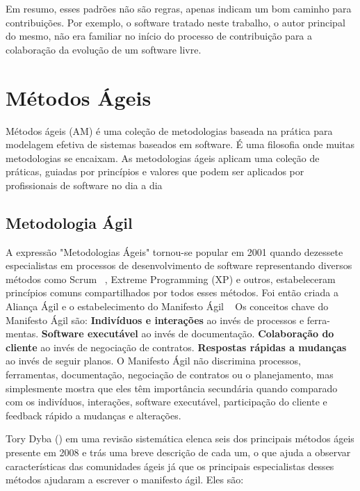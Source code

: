 
Em resumo, esses padrões não são regras, apenas indicam um bom caminho para contribuições. Por exemplo, o software tratado neste trabalho, o autor principal do mesmo, não era familiar no início do processo de contribuição para a colaboração da evolução de um software livre.

\section{Métodos Ágeis}
\label{sec-metedos-ageis}

Métodos ágeis (AM) é uma coleção de metodologias baseada na prática para modelagem efetiva de sistemas baseados em software. É uma filosofia onde muitas metodologias se encaixam. As metodologias ágeis aplicam uma coleção de práticas, guiadas por princípios e valores que podem ser aplicados por profissionais de software no dia a dia~\cite{manifesto2001}%

\subsection{Metodologia Ágil}
\label{metodologia-agil}

A expressão "Metodologias Ágeis" tornou-se popular em 2001 quando dezessete especialistas em processos de desenvolvimento de software representando diversos métodos como Scrum ~\cite{schwaber2002},
Extreme Programming (XP) e outros, estabeleceram princípios comuns compartilhados por todos esses métodos. Foi então criada a Aliança Ágil e o estabelecimento do Manifesto Ágil ~\cite{manifesto2001}
Os conceitos chave do Manifesto Ágil são:
\textbf{Indivíduos e interações} ao invés de processos e ferra-
mentas.
\textbf{Software executável} ao invés de documentação.
\textbf{Colaboração do cliente} ao invés de negociação de contratos.
\textbf{Respostas rápidas a mudanças} ao invés de seguir planos.
O Manifesto Ágil não discrimina processos, ferramentas, documentação, negociação de contratos ou o planejamento, mas simplesmente mostra que eles têm importância secundária quando comparado com os indivíduos, interações, software executável, participação do cliente e feedback rápido a mudanças e alterações.

%
Tory Dyba (\citeyear{dyba2008}) em uma revisão sistemática elenca seis dos principais métodos ágeis presente em 2008 e trás uma breve descrição de cada um, o que ajuda a observar características das comunidades ágeis já que os principais especialistas desses métodos ajudaram a escrever o manifesto ágil. Eles são:

